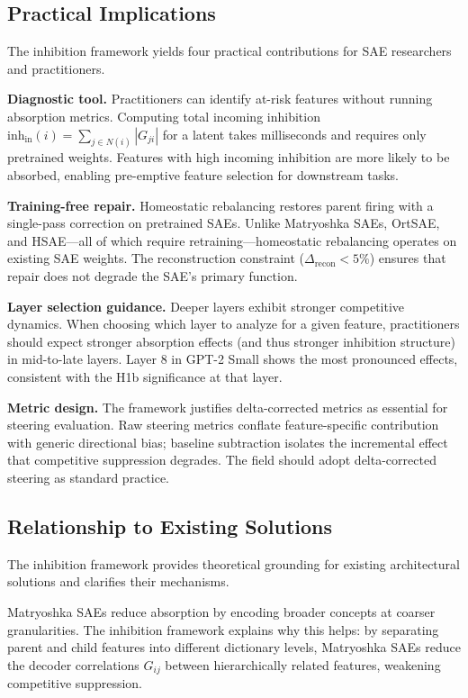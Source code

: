 \documentclass{article}
\begin{document}
\subsection{Practical Implications}

The inhibition framework yields four practical contributions for SAE researchers and practitioners.

\textbf{Diagnostic tool.} Practitioners can identify at-risk features without running absorption metrics. Computing total incoming inhibition $\text{inh}_{\text{in}}(i) = \sum_{j \in N(i)} |G_{ji}|$ for a latent takes milliseconds and requires only pretrained weights. Features with high incoming inhibition are more likely to be absorbed, enabling pre-emptive feature selection for downstream tasks.

\textbf{Training-free repair.} Homeostatic rebalancing restores parent firing with a single-pass correction on pretrained SAEs. Unlike Matryoshka SAEs, OrtSAE, and HSAE---all of which require retraining---homeostatic rebalancing operates on existing SAE weights. The reconstruction constraint ($\Delta_{\text{recon}} < 5\%$) ensures that repair does not degrade the SAE's primary function.

\textbf{Layer selection guidance.} Deeper layers exhibit stronger competitive dynamics. When choosing which layer to analyze for a given feature, practitioners should expect stronger absorption effects (and thus stronger inhibition structure) in mid-to-late layers. Layer 8 in GPT-2 Small shows the most pronounced effects, consistent with the H1b significance at that layer.

\textbf{Metric design.} The framework justifies delta-corrected metrics as essential for steering evaluation. Raw steering metrics conflate feature-specific contribution with generic directional bias; baseline subtraction isolates the incremental effect that competitive suppression degrades. The field should adopt delta-corrected steering as standard practice.

\subsection{Relationship to Existing Solutions}

The inhibition framework provides theoretical grounding for existing architectural solutions and clarifies their mechanisms.

Matryoshka SAEs \citep{bussmann2025matryoshka} reduce absorption by encoding broader concepts at coarser granularities. The inhibition framework explains why this helps: by separating parent and child features into different dictionary levels, Matryoshka SAEs reduce the decoder correlations $G_{ij}$ between hierarchically related features, weakening competitive suppression.
\end{document}
